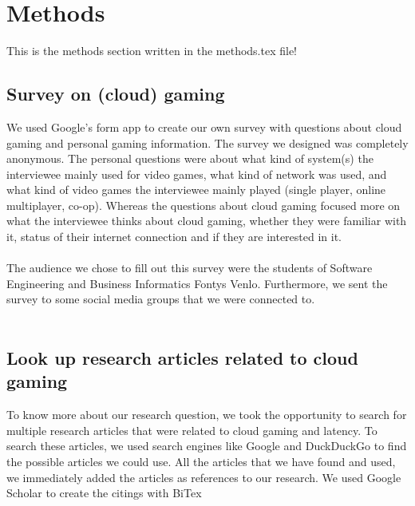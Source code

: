 \section{Methods}
This is the methods section written in the methods.tex file!

\subsection{Survey on (cloud) gaming}
We used Google's form app to create our own survey with questions about cloud gaming and personal gaming information. The survey we designed was completely anonymous. The personal questions were about what kind of system(s) the interviewee mainly used for video games, what kind of network was used, and what kind of video games the interviewee mainly played (single player, online multiplayer, co-op). Whereas the questions about cloud gaming focused more on what the interviewee thinks about cloud gaming, whether they were familiar with it, status of their internet connection and if they are interested in it.
\\\\
The audience we chose to fill out this survey were the students of Software Engineering and Business Informatics Fontys Venlo. Furthermore, we sent the survey to some social media groups that we were connected to.
\\\\
\subsection{Look up research articles related to cloud gaming}
To know more about our research question, we took the opportunity to search for multiple research articles that were related to cloud gaming and latency. To search these articles, we used search engines like Google and DuckDuckGo to find the possible articles we could use. All the articles that we have found and used, we immediately added the articles as references to our research. We used Google Scholar to create the citings with BiTex